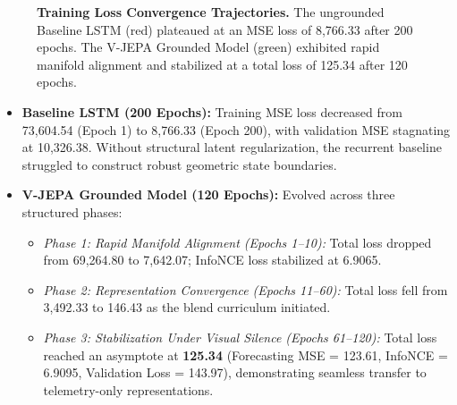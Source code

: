 \documentclass[11pt,a4paper]{article}
\begin{document}
\begin{figure}[ht!]
    \centering
    \caption{\textbf{Training Loss Convergence Trajectories.} The ungrounded Baseline LSTM (red) plateaued at an MSE loss of 8,766.33 after 200 epochs. The V-JEPA Grounded Model (green) exhibited rapid manifold alignment and stabilized at a total loss of 125.34 after 120 epochs.}
    \label{fig:loss_curves}
\end{figure}

\begin{itemize}
    \item \textbf{Baseline LSTM (200 Epochs):} Training MSE loss decreased from 73,604.54 (Epoch 1) to 8,766.33 (Epoch 200), with validation MSE stagnating at 10,326.38. Without structural latent regularization, the recurrent baseline struggled to construct robust geometric state boundaries.
    \item \textbf{V-JEPA Grounded Model (120 Epochs):} Evolved across three structured phases:
    \begin{itemize}
        \item \textit{Phase 1: Rapid Manifold Alignment (Epochs 1--10):} Total loss dropped from 69,264.80 to 7,642.07; InfoNCE loss stabilized at 6.9065.
        \item \textit{Phase 2: Representation Convergence (Epochs 11--60):} Total loss fell from 3,492.33 to 146.43 as the blend curriculum initiated.
        \item \textit{Phase 3: Stabilization Under Visual Silence (Epochs 61--120):} Total loss reached an asymptote at \textbf{125.34} (Forecasting MSE = 123.61, InfoNCE = 6.9095, Validation Loss = 143.97), demonstrating seamless transfer to telemetry-only representations.
    \end{itemize}
\end{itemize}
\end{document}
